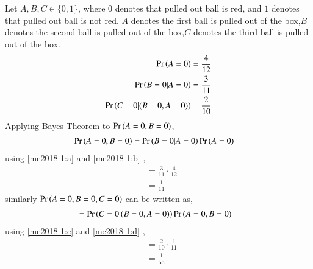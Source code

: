  

Let $A,B,C \in \{0,1\}$, where $0$ denotes that pulled out ball is red, and $1$ denotes that pulled out ball is not red. $A$ denotes the first ball is pulled out of the box,$B$ denotes the second ball is pulled out of the box,$C$ denotes the third ball is pulled out of the box.
\begin{align}
    \pr{A=0} &= \frac{4}{12} \label{me2018-1:a}\\
    \pr{B=0|A=0} &=\frac{3}{11} \label{me2018-1:b}\\
    \pr{C=0|(B=0,A=0)} &=\frac{2}{10}  \label{me2018-1:c}
\end{align}
Applying Bayes Theorem to $\Pr\left(A=0,B=0\right)$,
\begin{align}
  \Pr\left(A=0,B=0\right)  &= \Pr\left(B=0|A=0\right)\Pr\left(A=0\right)
  \end{align}
  using \eqref{me2018-1:a} and \eqref{me2018-1:b} ,
\begin{align}  
    &=\frac{3}{11}\cdot \frac{4}{12}\\
    &= \frac{1}{11}  \label{me2018-1:d}
\end{align}
similarly $\Pr\left(A=0,B=0,C=0\right)$ can be written as, 
\begin{align}
  &= \Pr\left(C=0|(B=0,A=0)\right)\Pr\left(A=0,B=0\right)
  \end{align}
  using \eqref{me2018-1:c} and \eqref{me2018-1:d} , 
  \begin{align}
    &=\frac{2}{10}\cdot \frac{1}{11}\\
    &= \frac{1}{55}
\end{align}